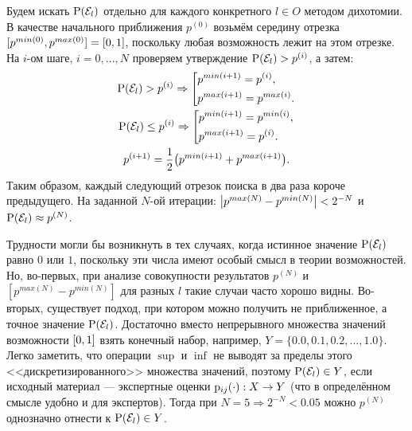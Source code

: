 \documentclass{article}
\begin{document}
Будем искать ${\mathrm{P}}(\mathcal{E}_l)$ отдельно для каждого конкретного $l \in O$ методом дихотомии. В качестве начального приближения $p^{(0)}$ возьмём середину отрезка $[p^{min(0)}, p^{max(0)}] = [0,1]$, поскольку любая возможность лежит на этом отрезке. На $i$-ом шаге, $i = 0, ..., N$ проверяем утверждение ${\mathrm{P}}(\mathcal{E}_l) > p^{(i)}$, а затем:
\begin{gather*}
 \P(\Eps_l) > p^{(i)} \Rightarrow 
    \left[ 
      \begin{gathered} 
        p^{min(i+1)} = p^{(i)}, \hfill 
        \\ 
        p^{max(i+1)} = p^{max(i)}. \hfill 
        \\ 
      \end{gathered} 
    \right. \\ 
 \P(\Eps_l) \leq p^{(i)} \Rightarrow 
    \left[ 
      \begin{gathered} 
        p^{min(i+1)} = p^{min(i)}, \hfill 
        \\ 
        p^{max(i+1)} = p^{(i)}. \hfill 
        \\ 
      \end{gathered} 
    \right. \\
 p^{(i+1)} = \frac{1}{2}\big(p^{min(i+1)} + p^{max(i+1)}\big).  
\end{gather*}
Таким образом, каждый следующий отрезок поиска в два раза короче предыдущего. На заданной $N$-ой итерации: $\left| p^{max(N)} - p^{min(N)} \right| < 2^{-N}$ и ${\mathrm{P}}(\mathcal{E}_l) \approx p^{(N)}$. %

Трудности могли бы возникнуть в тех случаях, когда истинное значение ${\mathrm{P}}(\mathcal{E}_l)$ равно $0$ или $1$, поскольку эти числа имеют особый смысл в теории возможностей. Но, во-первых, при анализе совокупности результатов $p^{(N)}$ и $[p^{max(N)} - p^{min(N)}]$ для разных $l$ такие случаи часто хорошо видны. Во-вторых, существует подход, при котором можно получить не приближенное, а точное значение ${\mathrm{P}}(\mathcal{E}_l)$. Достаточно вместо непрерывного множества значений возможности $[0,1]$ взять конечный набор, например, $Y = \{0.0, 0.1, 0.2, ..., 1.0\}$. Легко заметить, что операции $\sup$ и $\inf$ не выводят за пределы этого <<дискретизированного>> множества значений, поэтому ${\mathrm{P}}(\mathcal{E}_l) \in Y$, если исходный материал --- экспертные оценки ${\mathrm{p}}_{ij}(\cdot): X \rightarrow Y$ (что в определённом смысле удобно и для экспертов). Тогда при $N = 5 \Rightarrow 2^{-N} < 0.05$ можно $p^{(N)}$ однозначно отнести к ${\mathrm{P}}(\mathcal{E}_l) \in Y$.
\end{document}
